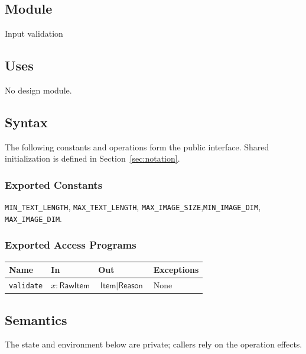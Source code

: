 \documentclass[12pt, titlepage]{article}
\newcommand{\ty}[1]{\textsf{#1}}
\newcommand{\Const}[1]{\texttt{#1}}
\begin{document}
\subsection{Module}

Input validation

\subsection{Uses}

No design module.

\subsection{Syntax}

The following constants and operations form the public interface. Shared initialization is defined in Section~\ref{sec:notation}.

\subsubsection{Exported Constants}

\Const{MIN\_\allowbreak{}TEXT\_\allowbreak{}LENGTH}, \Const{MAX\_\allowbreak{}TEXT\_\allowbreak{}LENGTH}, \Const{MAX\_\allowbreak{}IMAGE\_\allowbreak{}SIZE},\newline \Const{MIN\_\allowbreak{}IMAGE\_\allowbreak{}DIM}, \Const{MAX\_\allowbreak{}IMAGE\_\allowbreak{}DIM}.

\subsubsection{Exported Access Programs}

\begin{center}
\begin{tabular}{p{3.3cm} p{4cm} p{4cm} p{2.4cm}}
\hline
\textbf{Name} & \textbf{In} & \textbf{Out} & \textbf{Exceptions} \\
\hline
\texttt{validate} & $x:\ty{RawItem}$ & $\ty{Item}\mid\ty{Reason}$ & None \\
\hline
\end{tabular}
\end{center}

\subsection{Semantics}

The state and environment below are private; callers rely on the operation effects.
\end{document}
